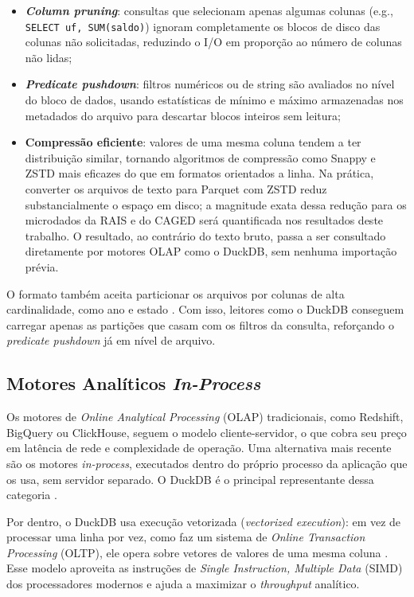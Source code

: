 \begin{itemize}
    \item \textbf{\textit{Column pruning}}: consultas que selecionam apenas algumas colunas (e.g., \texttt{SELECT uf, SUM(saldo)}) ignoram completamente os blocos de disco das colunas não solicitadas, reduzindo o I/O em proporção ao número de colunas não lidas;

    \item \textbf{\textit{Predicate pushdown}}: filtros numéricos ou de string são avaliados no nível do bloco de dados, usando estatísticas de mínimo e máximo armazenadas nos metadados do arquivo para descartar blocos inteiros sem leitura;

    \item \textbf{Compressão eficiente}: valores de uma mesma coluna tendem a ter distribuição similar, tornando algoritmos de compressão como Snappy e ZSTD mais eficazes do que em formatos orientados a linha. Na prática, converter os arquivos de texto para Parquet com ZSTD reduz substancialmente o espaço em disco; a magnitude exata dessa redução para os microdados da RAIS e do CAGED será quantificada nos resultados deste trabalho. O resultado, ao contrário do texto bruto, passa a ser consultado diretamente por motores OLAP como o DuckDB, sem nenhuma importação prévia.
\end{itemize}

O formato também aceita particionar os arquivos por colunas de alta cardinalidade, como ano e estado \cite{ApacheParquet2024}. Com isso, leitores como o DuckDB conseguem carregar apenas as partições que casam com os filtros da consulta, reforçando o \textit{predicate pushdown} já em nível de arquivo.

\subsection{Motores Analíticos \textit{In-Process}}

Os motores de \textit{Online Analytical Processing} (OLAP) tradicionais, como Redshift, BigQuery ou ClickHouse, seguem o modelo cliente-servidor, o que cobra seu preço em latência de rede e complexidade de operação. Uma alternativa mais recente são os motores \textit{in-process}, executados dentro do próprio processo da aplicação que os usa, sem servidor separado. O DuckDB é o principal representante dessa categoria
\cite{Raasveldt2019}.

Por dentro, o DuckDB usa execução vetorizada (\textit{vectorized execution}): em vez de processar uma linha por vez, como faz um sistema de \textit{Online Transaction Processing} (OLTP), ele opera sobre vetores de valores de uma mesma coluna \cite{Raasveldt2019}. Esse modelo aproveita as instruções de \textit{Single Instruction, Multiple Data} (SIMD) dos processadores modernos e ajuda a maximizar o \textit{throughput} analítico.


